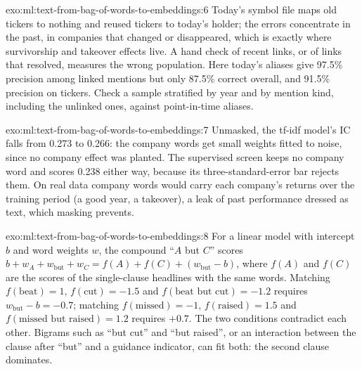 \begin{solution}{exo:ml:text-from-bag-of-words-to-embeddings:6}
Today's symbol file maps old tickers to nothing and reused tickers to today's holder; the errors concentrate in the past,
in companies that changed or disappeared, which is exactly where survivorship and takeover effects live. A hand check of
recent links, or of links that resolved, measures the wrong population. Here today's aliases give 97.5\% precision among
linked mentions but only 87.5\% correct overall, and 91.5\% precision on tickers. Check a sample stratified by year and by
mention kind, including the unlinked ones, against point-in-time aliases.
\end{solution}

\begin{solution}{exo:ml:text-from-bag-of-words-to-embeddings:7}
Unmasked, the tf-idf model's IC falls from 0.273 to 0.266: the company words get small weights fitted to noise, since no
company effect was planted. The supervised screen keeps no company word and scores 0.238 either way, because its
three-standard-error bar rejects them. On real data company words would carry each company's returns over the training
period (a good year, a takeover), a leak of past performance dressed as text, which masking prevents.
\end{solution}

\begin{solution}{exo:ml:text-from-bag-of-words-to-embeddings:8}
For a linear model with intercept $b$ and word weights $w$, the compound ``$A$ but $C$'' scores $b + w_A + w_{\text{but}} + w_C
= f(A) + f(C) + (w_{\text{but}} - b)$, where $f(A)$ and $f(C)$ are the scores of the single-clause headlines with the same
words. Matching $f(\text{beat}) = 1$, $f(\text{cut}) = -1.5$ and $f(\text{beat but cut}) = -1.2$ requires $w_{\text{but}} - b =
-0.7$; matching $f(\text{missed}) = -1$, $f(\text{raised}) = 1.5$ and $f(\text{missed but raised}) = 1.2$ requires $+0.7$. The
two conditions contradict each other. Bigrams such as ``but cut'' and ``but raised'', or an interaction between the clause
after ``but'' and a guidance indicator, can fit both: the second clause dominates.
\end{solution}

